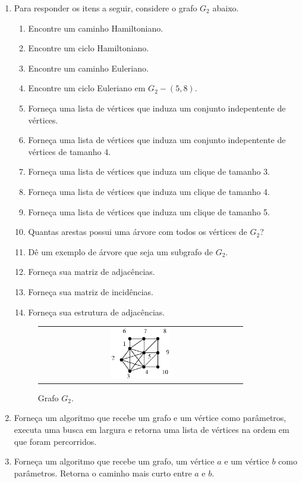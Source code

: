 \begin{enumerate}
  \item Para responder os itens a seguir, considere o grafo $G_2$ abaixo.
    \begin{enumerate}
      \item Encontre um caminho Hamiltoniano.
      \item Encontre um ciclo Hamiltoniano.
      \item Encontre um caminho Euleriano.
      \item Encontre um ciclo Euleriano em $G_2 - (5,8)$.
      \item Forneça uma lista de vértices que induza um conjunto indepentente de vértices.
      \item Forneça uma lista de vértices que induza um conjunto indepentente de vértices de tamanho 4.
      \item Forneça uma lista de vértices que induza um clique de tamanho 3.
      \item Forneça uma lista de vértices que induza um clique de tamanho 4.
      \item Forneça uma lista de vértices que induza um clique de tamanho 5.
      \item Quantas arestas possui uma árvore com todos os vértices de $G_2$?
      \item Dê um exemplo de árvore que seja um subgrafo de $G_2$.
      \item Forneça sua matriz de adjacências.
      \item Forneça sua matriz de incidências.
      \item Forneça sua estrutura de adjacências.
    \end{enumerate}

\begin{figure}[h!]
  \begin{center}
    \begin{tabular}{c}
      \includegraphics[width=0.3\textwidth]{images/02/ex01.eps}
    \end{tabular}
  \end{center}
  \caption*{\label{fig:ex:01} Grafo $G_2$.}
\end{figure}

  \item Forneça um algoritmo que recebe um grafo e um vértice como parâmetros, executa uma busca em largura e retorna uma lista de vértices na ordem em que foram percorridos.

  \item Forneça um algoritmo que recebe um grafo, um vértice $a$ e um vértice $b$ como parâmetros. Retorna o caminho mais curto entre $a$ e $b$.


\end{enumerate}

